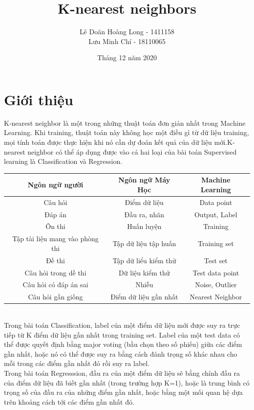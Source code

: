 \documentclass{article}
\title{K-nearest neighbors}
\author{Lê Doãn Hoàng Long - 1411158 \\ Lưu Minh Chí - 18110065}
\date{Tháng 12 năm 2020}
\begin{document}
\maketitle

\section{Giới thiệu}
K-nearest neighbor là một trong những thuật toán đơn giản nhất trong Machine Learning. Khi training, thuật toán này không học một điều gì từ dữ liệu training, mọi tính toán được thực hiện khi nó cần dự đoán kết quả của dữ liệu mới.K-nearest neighbor có thể áp dụng được vào cả hai loại của bài toán Supervised learning là Classification và Regression.

\begin{tabular}{ |c|c|c| }
\hline
Ngôn ngữ người & Ngôn ngữ Máy Học & Machine Learning \\ \hline
Câu hỏi & Điểm dữ liệu & Data point \\ \hline
Đáp án & Đầu ra, nhãn & Output, Label \\ \hline
Ôn thi & Huấn luyện & Training \\ \hline
Tập tài liệu mang vào phòng thi & Tập dữ liệu tập huấn & Training set \\ \hline
Đề thi & Tập dữ liểu kiểm thử & Test set \\ \hline
Câu hỏi trong dề thi & Dữ liệu kiểm thử & Test data point \\ \hline
Câu hỏi có đáp án sai & Nhiễu & Noise, Outlier \\ \hline
Câu hỏi gần giống & Điểm dữ liệu gần nhất & Nearest Neighbor \\
\hline
\end{tabular}
\\

Trong bài toán Classification, label của một điểm dữ liệu mới được suy ra trực tiếp từ K điểm dữ liệu gần nhất trong training set. Label của một test data có thể được quyết định bằng major voting (bầu chọn theo số phiếu) giữa các điểm gần nhất, hoặc nó có thể được suy ra bằng cách đánh trọng số khác nhau cho mỗi trong các điểm gần nhất đó rồi suy ra label.
\\

Trong bài toán Regresssion, đầu ra của một điểm dữ liệu sẽ bằng chính đầu ra của điểm dữ liệu đã biết gần nhất (trong trường hợp K=1), hoặc là trung bình có trọng số của đầu ra của những điểm gần nhất, hoặc bằng một mối quan hệ dựa trên khoảng cách tới các điểm gần nhất đó.
\\
\end{document}
